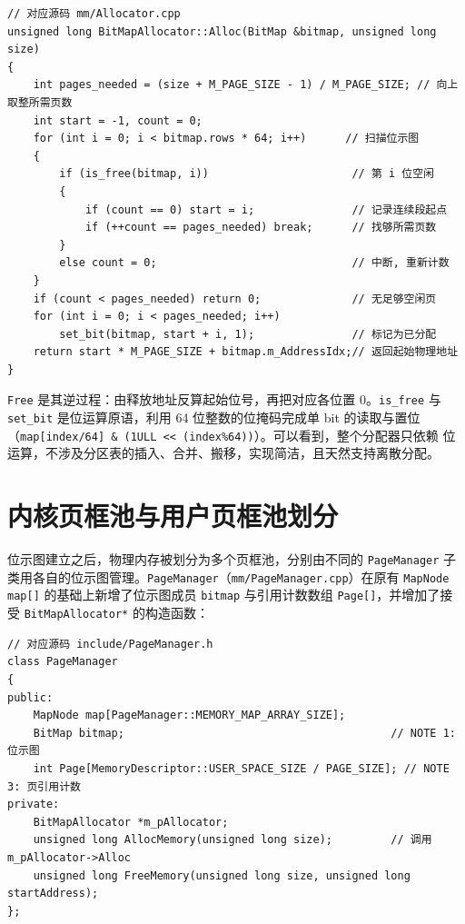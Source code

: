 \begin{lstlisting}[caption={BitMapAllocator::Alloc 分配算法},label={lst:bitmap-alloc}]
// 对应源码 mm/Allocator.cpp
unsigned long BitMapAllocator::Alloc(BitMap &bitmap, unsigned long size)
{
    int pages_needed = (size + M_PAGE_SIZE - 1) / M_PAGE_SIZE; // 向上取整所需页数
    int start = -1, count = 0;
    for (int i = 0; i < bitmap.rows * 64; i++)      // 扫描位示图
    {
        if (is_free(bitmap, i))                      // 第 i 位空闲
        {
            if (count == 0) start = i;               // 记录连续段起点
            if (++count == pages_needed) break;      // 找够所需页数
        }
        else count = 0;                              // 中断, 重新计数
    }
    if (count < pages_needed) return 0;              // 无足够空闲页
    for (int i = 0; i < pages_needed; i++)
        set_bit(bitmap, start + i, 1);               // 标记为已分配
    return start * M_PAGE_SIZE + bitmap.m_AddressIdx;// 返回起始物理地址
}
\end{lstlisting}

\texttt{Free} 是其逆过程：由释放地址反算起始位号，再把对应各位置 0。\texttt{is\_free}
与 \texttt{set\_bit} 是位运算原语，利用 64 位整数的位掩码完成单 bit 的读取与置位
（\texttt{map[index/64] \& (1ULL << (index\%64))}）。可以看到，整个分配器只依赖
位运算，不涉及分区表的插入、合并、搬移，实现简洁，且天然支持离散分配。

\section{内核页框池与用户页框池划分}
位示图建立之后，物理内存被划分为多个页框池，分别由不同的 \texttt{PageManager}
子类用各自的位示图管理。\texttt{PageManager}（\texttt{mm/PageManager.cpp}）在原有
\texttt{MapNode map[]} 的基础上新增了位示图成员 \texttt{bitmap} 与引用计数数组
\texttt{Page[]}，并增加了接受 \texttt{BitMapAllocator*} 的构造函数：

\begin{lstlisting}[caption={PageManager 新增的位示图与引用计数成员},label={lst:pm-members}]
// 对应源码 include/PageManager.h
class PageManager
{
public:
    MapNode map[PageManager::MEMORY_MAP_ARRAY_SIZE];
    BitMap bitmap;                                         // NOTE 1: 位示图
    int Page[MemoryDescriptor::USER_SPACE_SIZE / PAGE_SIZE]; // NOTE 3: 页引用计数
private:
    BitMapAllocator *m_pAllocator;
    unsigned long AllocMemory(unsigned long size);         // 调用 m_pAllocator->Alloc
    unsigned long FreeMemory(unsigned long size, unsigned long startAddress);
};
\end{lstlisting}


